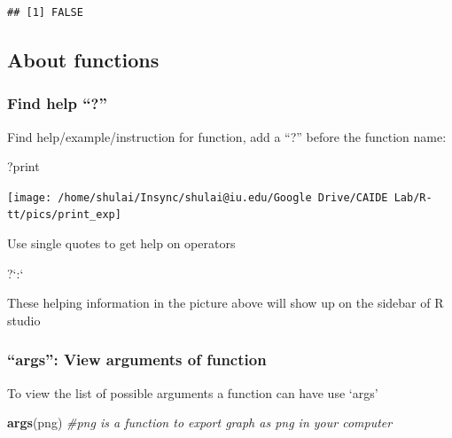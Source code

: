 \documentclass[]{article}
\newenvironment{Shaded}{\begin{snugshade}}{\end{snugshade}}
\newcommand{\CommentTok}[1]{\textcolor[rgb]{0.56,0.35,0.01}{\textit{#1}}}
\newcommand{\DataTypeTok}[1]{\textcolor[rgb]{0.13,0.29,0.53}{#1}}
\newcommand{\KeywordTok}[1]{\textcolor[rgb]{0.13,0.29,0.53}{\textbf{#1}}}
\newcommand{\NormalTok}[1]{#1}
\newcommand{\StringTok}[1]{\textcolor[rgb]{0.31,0.60,0.02}{#1}}
\begin{document}
\begin{verbatim}
## [1] FALSE
\end{verbatim}

\hypertarget{about-functions}{%
\subsection{About functions}\label{about-functions}}

\hypertarget{find-help}{%
\subsubsection{Find help ``?''}\label{find-help}}

Find help/example/instruction for function, add a ``?'' before the
function name:

\begin{Shaded}
\begin{Highlighting}[]
\NormalTok{?print}
\end{Highlighting}
\end{Shaded}

\texttt{[image: /home/shulai/Insync/shulai@iu.edu/Google Drive/CAIDE Lab/R-tt/pics/print\_exp]}

Use single quotes to get help on operators

\begin{Shaded}
\begin{Highlighting}[]
\NormalTok{?}\StringTok{`}\DataTypeTok{:}\StringTok{`}
\end{Highlighting}
\end{Shaded}

These helping information in the picture above will show up on the
sidebar of R studio

\hypertarget{args-view-arguments-of-function}{%
\subsubsection{``args'': View arguments of
function}\label{args-view-arguments-of-function}}

To view the list of possible arguments a function can have use `args'

\begin{Shaded}
\begin{Highlighting}[]
\KeywordTok{args}\NormalTok{(png) }\CommentTok{#png is a function to export graph as png in your computer}
\end{Highlighting}
\end{Shaded}
\end{document}
